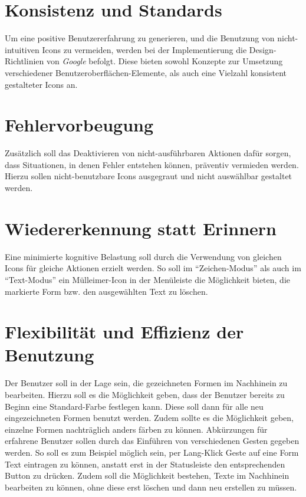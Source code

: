 \section{Konsistenz und Standards}
Um eine positive Benutzererfahrung zu generieren, und die Benutzung von nicht-intuitiven Icons zu vermeiden, werden bei der Implementierung die Design-Richtlinien von \emph{Google} befolgt.
Diese bieten sowohl Konzepte zur Umsetzung verschiedener Benutzeroberflächen-Elemente, als auch eine Vielzahl konsistent gestalteter Icons an.  

\section{Fehlervorbeugung}
Zusätzlich soll das Deaktivieren von nicht-ausführbaren Aktionen dafür sorgen, dass Situationen, in denen Fehler entstehen können, präventiv vermieden werden.
Hierzu sollen nicht-benutzbare Icons ausgegraut und nicht auswählbar gestaltet werden.

\section{Wiedererkennung statt Erinnern}
Eine minimierte kognitive Belastung soll durch die Verwendung von gleichen Icons für gleiche Aktionen erzielt werden.
So soll im ``Zeichen-Modus'' als auch im ``Text-Modus'' ein Mülleimer-Icon in der Menüleiste die Möglichkeit bieten, die markierte Form bzw. den ausgewählten Text zu löschen.

\section{Flexibilität und Effizienz der Benutzung}
Der Benutzer soll in der Lage sein, die gezeichneten Formen im Nachhinein zu bearbeiten.
Hierzu soll es die Möglichkeit geben, dass der Benutzer bereits zu Beginn eine Standard-Farbe festlegen kann.
Diese soll dann für alle neu eingezeichneten Formen benutzt werden.
Zudem sollte es die Möglichkeit geben, einzelne Formen nachträglich anders färben zu können.
Abkürzungen für erfahrene Benutzer sollen durch das Einführen von verschiedenen Gesten gegeben werden.
So soll es zum Beispiel möglich sein, per Lang-Klick Geste auf eine Form Text eintragen zu können, anstatt erst in der Statusleiste den entsprechenden Button zu drücken.
Zudem soll die Möglichkeit bestehen, Texte im Nachhinein bearbeiten zu können, ohne diese erst löschen und dann neu erstellen zu müssen.


